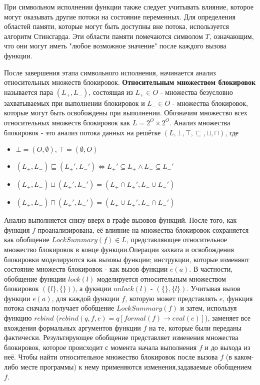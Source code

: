 При символьном исполнении функции также следует учитывать влияние, которое могут оказывать другие потоки на состояние переменных. Для определения областей памяти, которые могут быть доступны вне потока, используется алгоритм Стинсгарда. Эти области памяти помечаются символом $T$, означающим, что они могут иметь "любое возможное значение" после каждого вызова функции.

После завершения этапа символьного исполнения, начинается анализ относительных множеств блокировок. \textbf{Относительным множеством блокировок} называется пара $(L_{+}, L_{-})$, состоящая из $L_{+} \in O$ - множества безусловно захватываемых при выполнении блокировок и $L_{-} \in O$ - множества блокировок, которые могут быть освобождены при выполнении. Обозначим множество всех относительных множеств блокировок как $L = 2^{O} \times 2^{O}$. Анализ множества блокировок - это анализ потока данных на решётке $(L, \bot, \top, \sqsubseteq, \sqcup, \sqcap)$, где
\begin{itemize}
\item $\bot = (O, \emptyset)$, $\top = (\emptyset, O)$
\item $(L_{+}, L_{-}) \sqsubseteq (L_{+}', L_{-}') \Longleftrightarrow L_{+}' \subseteq L_{+} \wedge L_{-} \subseteq L_{-}'$
\item $(L_{+}, L_{-}) \sqcup (L_{+}', L_{-}') = (L_{+} \cap L_{+}', L_{-} \cup L_{-}')$
\item $(L_{+}, L_{-}) \sqcap (L_{+}', L_{-}') = (L_{+} \cup L_{+}', L_{-} \cap L_{-}')$
\end{itemize}

Анализ выполняется снизу вверх в графе вызовов функций. После того, как функция $f$ проанализирована, её влияние на множества блокировок сохраняется как обобщение $LockSummary(f) \in L$, представляющее относительное множество блокировок в конце функции.Операции захвата и освобождения блокировки моделируются как вызовы функции; инструкции, которые изменяют состояние множеств блокировок - как вызов функции $e(a)$. В частности, обобщение функции $lock(l)$ моделируется относительным множеством блокировок $(\{l\}, \{\}))$, а фукнции $unlock(l)$ - $(\{\}, \{l\})$. Учитывая вызов функции $e(a)$, для каждой функции $f$, которую может представлять $e$, функция потока сначала получает обобщение $LockSummary(f)$ и затем, используя функцию $rebind$ ($rebind(q, f, e) = q[formal(f ) → eval(e)]$), заменяет все вхождения формальных аргументов функции $f$ на те, которые были переданы фактически. Результирующее обобщение представляет изменения множества блокировок, которое происходит с момента начала выполнения $f$ и до выхода из неё. Чтобы найти относительное множество блокировок после вызова $f$ (в каком-либо месте программы) к нему применяются изменения,задаваемые обобщением $f$.

